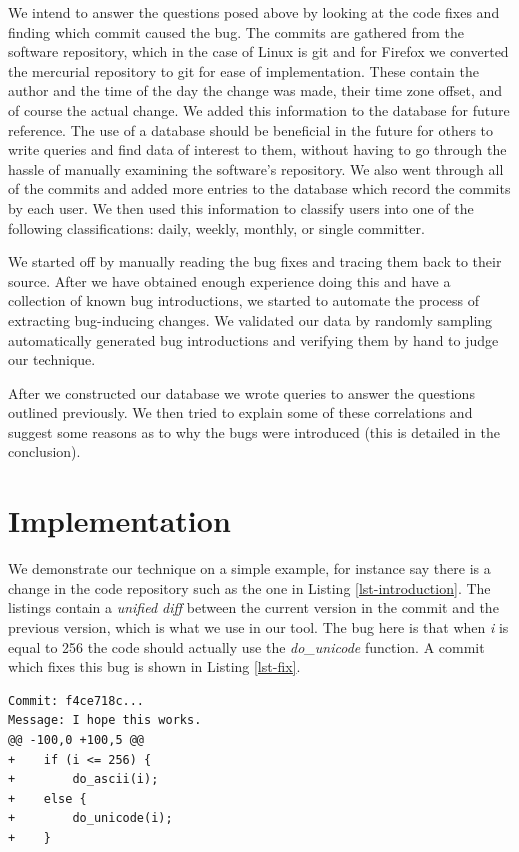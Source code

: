 \documentclass[preprint, 11pt]{sigplanconf}
\begin{document}
We intend to answer the questions posed above by looking at the code
fixes and finding which commit caused the bug. The commits are
gathered from the software repository, which in the case of Linux is
git and for Firefox we converted the mercurial repository to git for
ease of implementation. These contain the author and the time of the
day the change was made, their time zone offset, and of course the
actual change. We added this information to the database for future
reference. The use of a database should be beneficial in the future
for others to write queries and find data of interest to them, without
having to go through the hassle of manually examining the software's
repository. We also went through all of the commits and added more
entries to the database which record the commits by each user.  We
then used this information to classify users into one of the following
classifications: daily, weekly, monthly, or single committer.

We started off by manually reading the bug fixes and tracing them back
to their source. After we have obtained enough experience doing this
and have a collection of known bug introductions, we started to
automate the process of extracting bug-inducing changes. We validated
our data by randomly sampling automatically generated bug
introductions and verifying them by hand to judge our technique.

After we constructed our database we wrote queries to answer the questions
outlined previously. We then tried to explain some of these
correlations and suggest some reasons as to why the bugs were introduced (this
is detailed in the conclusion).

\section{Implementation}
\label{sec-impl}

We demonstrate our technique on a simple example, for instance say
there is a change in the code repository such as the one in Listing
\ref{lst-introduction}. The listings contain a {\em unified diff}
between the current version in the commit and the previous version,
which is what we use in our tool. The bug here is that when {\em i} is
equal to 256 the code should actually use the {\em do\_unicode}
function. A commit which fixes this bug is shown in Listing \ref{lst-fix}.

\newpage

\begin{lstlisting}[caption=An example bug introduction,label=lst-introduction, frame=single]
Commit: f4ce718c...
Message: I hope this works.
@@ -100,0 +100,5 @@
+    if (i <= 256) {
+        do_ascii(i);
+    else {
+        do_unicode(i);
+    }
\end{lstlisting}
\end{document}

